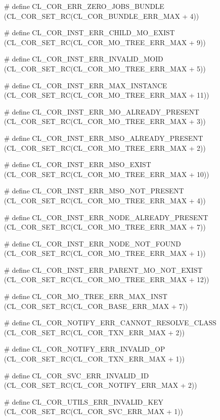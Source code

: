 \begin{flushleft}
\begin{CompactItemize}
\item \# define CL\_\-COR\_\-ERR\_\-ZERO\_\-JOBS\_\-BUNDLE (CL\_\-COR\_\-SET\_\-RC(CL\_\-COR\_\-BUNDLE\_\-ERR\_\-MAX + 4)) 
\item \# define CL\_\-COR\_\-INST\_\-ERR\_\-CHILD\_\-MO\_\-EXIST (CL\_\-COR\_\-SET\_\-RC(CL\_\-COR\_\-MO\_\-TREE\_\-ERR\_\-MAX + 9)) 
\item \# define CL\_\-COR\_\-INST\_\-ERR\_\-INVALID\_\-MOID (CL\_\-COR\_\-SET\_\-RC(CL\_\-COR\_\-MO\_\-TREE\_\-ERR\_\-MAX + 5)) 
\item \# define CL\_\-COR\_\-INST\_\-ERR\_\-MAX\_\-INSTANCE (CL\_\-COR\_\-SET\_\-RC(CL\_\-COR\_\-MO\_\-TREE\_\-ERR\_\-MAX + 11)) 
\item \# define CL\_\-COR\_\-INST\_\-ERR\_\-MO\_\-ALREADY\_\-PRESENT (CL\_\-COR\_\-SET\_\-RC(CL\_\-COR\_\-MO\_\-TREE\_\-ERR\_\-MAX + 3)) 
\item \# define CL\_\-COR\_\-INST\_\-ERR\_\-MSO\_\-ALREADY\_\-PRESENT (CL\_\-COR\_\-SET\_\-RC(CL\_\-COR\_\-MO\_\-TREE\_\-ERR\_\-MAX + 2)) 
\item \# define CL\_\-COR\_\-INST\_\-ERR\_\-MSO\_\-EXIST (CL\_\-COR\_\-SET\_\-RC(CL\_\-COR\_\-MO\_\-TREE\_\-ERR\_\-MAX + 10)) 
\item \# define CL\_\-COR\_\-INST\_\-ERR\_\-MSO\_\-NOT\_\-PRESENT (CL\_\-COR\_\-SET\_\-RC(CL\_\-COR\_\-MO\_\-TREE\_\-ERR\_\-MAX + 4)) 
\item \# define CL\_\-COR\_\-INST\_\-ERR\_\-NODE\_\-ALREADY\_\-PRESENT (CL\_\-COR\_\-SET\_\-RC(CL\_\-COR\_\-MO\_\-TREE\_\-ERR\_\-MAX + 7)) 
\item \# define CL\_\-COR\_\-INST\_\-ERR\_\-NODE\_\-NOT\_\-FOUND (CL\_\-COR\_\-SET\_\-RC(CL\_\-COR\_\-MO\_\-TREE\_\-ERR\_\-MAX + 1)) 
\item \# define CL\_\-COR\_\-INST\_\-ERR\_\-PARENT\_\-MO\_\-NOT\_\-EXIST (CL\_\-COR\_\-SET\_\-RC(CL\_\-COR\_\-MO\_\-TREE\_\-ERR\_\-MAX + 12)) 
\item \# define CL\_\-COR\_\-MO\_\-TREE\_\-ERR\_\-MAX\_\-INST (CL\_\-COR\_\-SET\_\-RC(CL\_\-COR\_\-BASE\_\-ERR\_\-MAX + 7)) 
\item \# define CL\_\-COR\_\-NOTIFY\_\-ERR\_\-CANNOT\_\-RESOLVE\_\-CLASS (CL\_\-COR\_\-SET\_\-RC(CL\_\-COR\_\-TXN\_\-ERR\_\-MAX + 2)) 
\item \# define CL\_\-COR\_\-NOTIFY\_\-ERR\_\-INVALID\_\-OP (CL\_\-COR\_\-SET\_\-RC(CL\_\-COR\_\-TXN\_\-ERR\_\-MAX + 1)) 
\item \# define CL\_\-COR\_\-SVC\_\-ERR\_\-INVALID\_\-ID (CL\_\-COR\_\-SET\_\-RC(CL\_\-COR\_\-NOTIFY\_\-ERR\_\-MAX + 2)) 
\item \# define CL\_\-COR\_\-UTILS\_\-ERR\_\-INVALID\_\-KEY (CL\_\-COR\_\-SET\_\-RC(CL\_\-COR\_\-SVC\_\-ERR\_\-MAX + 1)) 



\end{CompactItemize}
\end{flushleft}
